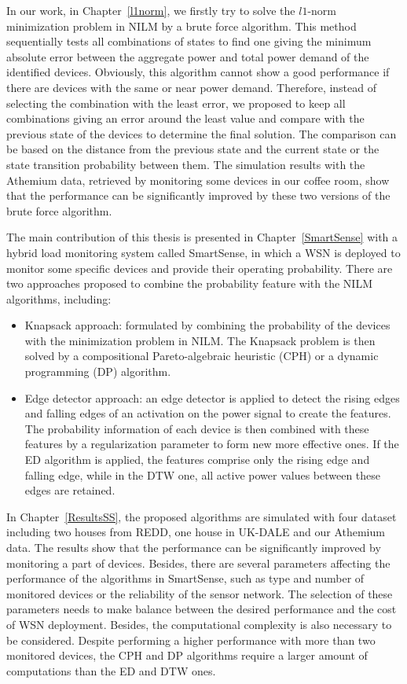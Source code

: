In our work, in Chapter~\ref{l1norm}, we firstly try to solve the $l1$-norm minimization problem in NILM by a brute force algorithm. This method sequentially tests all combinations of states to find one giving the minimum absolute error between the aggregate power and total power demand of the identified devices. Obviously, this algorithm cannot show a good performance if there are devices with the same or near power demand. Therefore, instead of selecting the combination with the least error, we proposed to keep all combinations giving an error around the least value and compare with the previous state of the devices to determine the final solution. The comparison can be based on the distance from the previous state and the current state or the state transition probability between them. The simulation results with the Athemium data, retrieved by monitoring some devices in our coffee room, show that the performance can be significantly improved by these two versions of the brute force algorithm.

The main contribution of this thesis is presented in Chapter~\ref{SmartSense} with a hybrid load monitoring system called SmartSense, in which a WSN is deployed to monitor some specific devices and provide their operating probability. There are two approaches 
proposed to combine the probability feature with the NILM algorithms, including:
\begin{itemize}
\item Knapsack approach: formulated by combining the probability of the devices with the minimization problem in NILM. The Knapsack problem is then solved by a compositional Pareto-algebraic heuristic (CPH) or a dynamic programming (DP) algorithm.
\item Edge detector approach: an edge detector is applied to detect the rising edges and falling edges of an activation on the power signal to create the features. The probability information of each device is then combined with these features by a regularization parameter to form new more effective ones. If the ED algorithm is applied, the features comprise only the rising edge and falling edge, while in the DTW one, all active power values between these edges are retained. 
\end{itemize}

In Chapter~\ref{ResultsSS}, the proposed algorithms are simulated with four dataset including two houses from REDD, one house in UK-DALE and our Athemium data. The results show that the performance can be significantly improved by monitoring a part of devices. Besides, there are several parameters affecting the performance of the algorithms in SmartSense, such as type and number of monitored devices or the reliability of the sensor network. The selection of these parameters needs to make balance between the desired performance and the cost of WSN deployment.
Besides, the computational complexity is also necessary to be considered. Despite performing a higher performance with more than two monitored devices, the CPH and DP algorithms require a larger amount of computations than the ED and DTW ones. 

